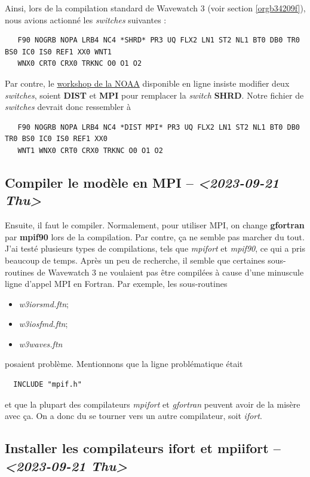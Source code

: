 \documentclass[10pt]{article}
\numberwithin{equation}{section}
\begin{document}
Ainsi, lors de la compilation standard de Wavewatch 3 (voir section \ref{orgb34209f}), nous avions actionné les \emph{switches} suivantes : 
\begin{verbatim}
   F90 NOGRB NOPA LRB4 NC4 *SHRD* PR3 UQ FLX2 LN1 ST2 NL1 BT0 DB0 TR0 BS0 IC0 IS0 REF1 XX0 WNT1
   WNX0 CRT0 CRX0 TRKNC O0 O1 O2
\end{verbatim}

Par contre, le \href{https://polar.ncep.noaa.gov/waves/workshop/pdfs/WW3-workshop-exercises-day4-MPI.pdf}{workshop de la NOAA} disponible en ligne insiste modifier deux \emph{switches}, soient \textbf{DIST} et \textbf{MPI} pour remplacer la \emph{switch} \textbf{SHRD}.
Notre fichier de \emph{switches} devrait donc ressembler à
\begin{verbatim}
   F90 NOGRB NOPA LRB4 NC4 *DIST MPI* PR3 UQ FLX2 LN1 ST2 NL1 BT0 DB0 TR0 BS0 IC0 IS0 REF1 XX0
   WNT1 WNX0 CRT0 CRX0 TRKNC O0 O1 O2
\end{verbatim}
\subsection{Compiler le modèle en MPI -- \textit{<2023-09-21 Thu>}}
\label{sec:org6a60584}
Ensuite, il faut le compiler.
Normalement, pour utiliser MPI, on change \textbf{gfortran} par \textbf{mpif90} lors de la compilation.
Par contre, ça ne semble pas marcher du tout.
J'ai testé plusieurs types de compilations, tels que \emph{mpifort} et \emph{mpif90}, ce qui a pris beaucoup de temps.
Après un peu de recherche, il semble que certaines sous-routines de Wavewatch 3 ne voulaient pas être compilées à cause d'une minuscule ligne d'appel MPI en Fortran.
Par exemple, les sous-routines
\begin{itemize}
\item \emph{w3iorsmd.ftn};
\item \emph{w3iosfmd.ftn};
\item \emph{w3waves.ftn}
\end{itemize}
posaient problème.
Mentionnons que la ligne problématique était
\begin{verbatim}
  INCLUDE "mpif.h"
\end{verbatim}
et que la plupart des compilateurs \emph{mpifort} et \emph{gfortran} peuvent avoir de la misère avec ça.
On a donc du se tourner vers un autre compilateur, soit \emph{ifort}. 
\subsection{Installer les compilateurs ifort et mpiifort -- \textit{<2023-09-21 Thu>}}
\label{sec:orgaed8e8f}
\end{document}
